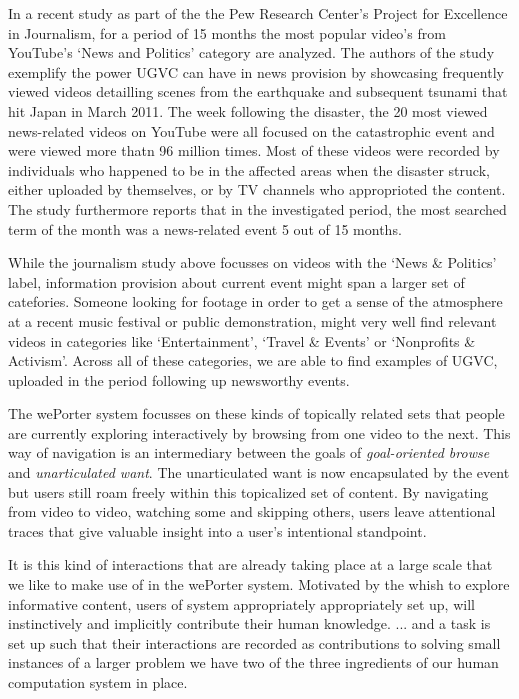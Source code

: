 In a recent study as part of the the Pew Research Center’s Project for Excellence in Journalism, for a period of 15 months the most popular video's from YouTube's `News and Politics' category are analyzed\cite{Rosenstiel:2012vb}. The authors of the study exemplify the power UGVC can have in news provision by showcasing frequently viewed videos detailling scenes from the earthquake and subsequent tsunami that hit Japan in March 2011. The week following the disaster, the 20 most viewed news-related videos on YouTube were all focused on the catastrophic event and were viewed more thatn 96 million times. Most of these videos were recorded by individuals who happened to be in the affected areas when the disaster struck, either uploaded by themselves, or by TV channels who approprioted the content. The study furthermore reports that in the investigated period, the most searched term of the month was a news-related event 5 out of 15 months.

While the journalism study above focusses on videos with the `News \& Politics' label, information provision about current event might span a larger set of catefories. Someone looking for footage in order to get a sense of the atmosphere at a recent music festival or public demonstration, might very well find relevant videos in categories like `Entertainment', `Travel \& Events' or `Nonprofits \& Activism'. Across all of these categories, we are able to find examples of UGVC, uploaded in the period following up newsworthy events.

The wePorter system focusses on these kinds of topically related sets that people are currently exploring interactively by browsing from one video to the next. This way of navigation is an intermediary between the goals of \textit{goal-oriented browse} and \textit{unarticulated want}. The unarticulated want is now encapsulated by the event but users still roam freely within this topicalized set of content. By navigating from video to video, watching some and skipping others, users leave attentional traces that give valuable insight into a user's intentional standpoint.

It is this kind of interactions that are already taking place at a large scale that we like to make use of in the wePorter system. Motivated by the whish to explore informative content, users of system appropriately appropriately set up, will instinctively and implicitly contribute their human knowledge.
...
and a task is set up such that their interactions are recorded as contributions to solving small instances of a larger problem we have two of the three ingredients of our human computation system in place.

